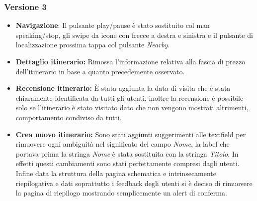 \subsubsection{Versione 3}

\begin{itemize}

\item \textbf{Navigazione}: Il pulsante play/pause è stato sostituito col man speaking/stop, gli swipe da icone con frecce a destra e sinistra e il pulsante di localizzazione prossima tappa col pulsante \emph{Nearby}.

\item \textbf{Dettaglio itinerario:} Rimossa l'informazione relativa alla fascia di prezzo dell'itinerario in base a quanto precedemente osservato.

\item \textbf{Recensione itinerario:} È stata aggiunta la data di visita che è stata chiaramente identificata da tutti gli utenti, inoltre la recensione è possibile solo se l'itinerario è stato visitato dato che non vengono mostrati altrimenti, comportamento condiviso da tutti.

\item \textbf{Crea nuovo itinerario:} Sono stati aggiunti suggerimenti alle textfield per rimuovere ogni ambiguità nel significato del campo \emph{Nome}, la label che portava prima la stringa \emph{Nome} è stata sostituita con la stringa \emph{Titolo}. In effetti questi cambiamenti sono stati perfettamente compresi dagli utenti. Infine data la struttura della pagina schematica e intrinsecamente riepilogativa e dati soprattutto i feedback degli utenti si è deciso di rimuovere la pagina di riepilogo mostrando semplicemente un alert di conferma.


\end{itemize}

